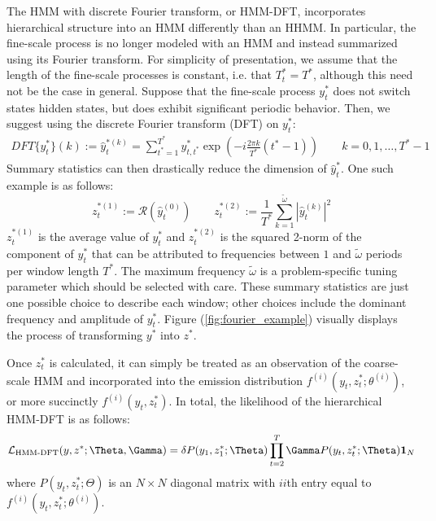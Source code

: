 The HMM with discrete Fourier transform, or HMM-DFT, incorporates hierarchical structure into an HMM differently than an HHMM. In particular, the fine-scale process is no longer modeled with an HMM and instead summarized using its Fourier transform. For simplicity of presentation, we assume that the length of the fine-scale processes is constant, i.e. that $T^*_t = T^*$, although this need not be the case in general. Suppose that the fine-scale process $y^*_t$ does not switch states hidden states, but does exhibit significant periodic behavior. Then, we suggest using the discrete Fourier transform (DFT) on $y^*_t$:
%
\begin{align*}
    DFT\{y^*_t\}(k) := \hat{y}^{*(k)}_{t} = \sum_{t^* = 1}^{T^*} y^*_{t,t^*}\exp\left(-i \frac{2\pi k}{T^*} (t^*-1)\right) \qquad k = 0, 1, \ldots, T^*-1
\end{align*}
%
Summary statistics can then drastically reduce the dimension of $\hat{y}^*_t$. One such example is as follows:
%
\begin{equation}
    \label{eqn:z}
    z_t^{*(1)} := \mathcal{R}\left(\hat{y}^{(0)}_t\right) \qquad z_t^{*(2)} := \frac{1}{T^*}\sum_{k=1}^{\tilde{\omega}}|\hat{y}^{(k)}_t|^2
\end{equation}
%
$z_t^{*(1)}$ is the average value of $y^*_t$ and $z_t^{*(2)}$ is the squared 2-norm of the component of $y^*_t$ that can be attributed to frequencies between $1$ and $\tilde{\omega}$ periods per window length $T^*$. The maximum frequency $\tilde{\omega}$ is a problem-specific tuning parameter which should be selected with care. These summary statistics are just one possible choice to describe each window; other choices include the dominant frequency and amplitude of $y^*_t$. Figure (\ref{fig:fourier_example}) visually displays the process of transforming $y^*$ into $z^*$.

Once $z^*_t$ is calculated, it can simply be treated as an observation of the coarse-scale HMM and incorporated into the emission distribution $f^{(i)}\left(y_t,z^*_t;\theta^{(i)}\right)$, or more succinctly $f^{(i)}\left(y_t,z^*_t\right)$. In total, the likelihood of the hierarchical HMM-DFT is as follows:
\begin{equation}
    \calL_{\text{HMM-DFT}}(y,z^*;\Theta,\Gamma) = \delta P(y_1,z^*_1;\Theta) \prod_{t=2}^T \Gamma P(y_t,z^*_t;\Theta) \mathbf{1}_N
    \label{HMMDFT_likelihood}
\end{equation}
where $P(y_t,z^*_t;\Theta)$ is an $N \times N$ diagonal matrix with $ii$th entry equal to $f^{(i)}\left(y_t,z^*_t;\theta^{(i)}\right)$.

